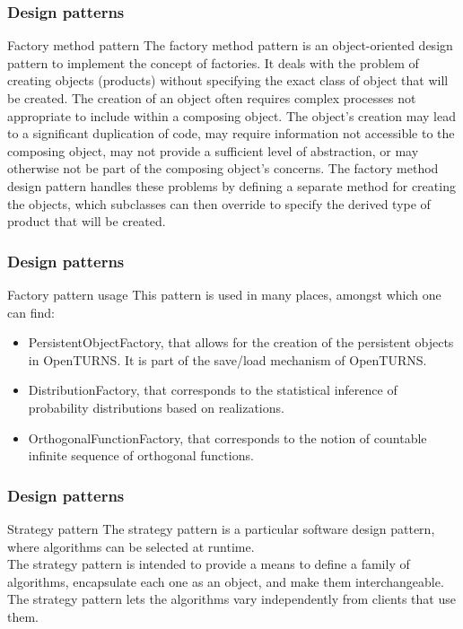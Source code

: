 \documentclass[8pt]{beamer}
\begin{document}
\begin{frame}
  \frametitle{Design patterns}
  \begin{block}{Factory method pattern}
    The \alert{factory method pattern} is an object-oriented design pattern to implement the concept of factories. It deals with the problem of creating objects (products) without specifying the exact class of object that will be created. The creation of an object often requires complex processes not appropriate to include within a composing object. The object's creation may lead to a significant duplication of code, may require information not accessible to the composing object, may not provide a sufficient level of abstraction, or may otherwise not be part of the composing object's concerns. The factory method design pattern handles these problems by defining a separate method for creating the objects, which subclasses can then override to specify the derived type of product that will be created.
  \end{block}
  \vspace{1mm}
  \centering {}
\end{frame}

\begin{frame}
  \frametitle{Design patterns}
  \begin{block}{Factory pattern usage}
    This pattern is used in many places, amongst which one can find:
    \begin{itemize}
    \item \alert{PersistentObjectFactory}, that allows for the creation of the persistent objects in OpenTURNS. It is part of the save/load mechanism of OpenTURNS.
    \item \alert{DistributionFactory}, that corresponds to the statistical inference of probability distributions based on realizations.
    \item \alert{OrthogonalFunctionFactory}, that corresponds to the notion of countable infinite sequence of orthogonal functions.
    \end{itemize}
  \end{block}
\end{frame}

\begin{frame}
  \frametitle{Design patterns}
  \begin{block}{Strategy pattern}
    The \alert{strategy pattern} is a particular software design pattern, where algorithms can be selected at runtime.\\
    The strategy pattern is intended to provide a means to define a family of algorithms, encapsulate each one as an object, and make them interchangeable. The strategy pattern lets the algorithms vary independently from clients that use them.
  \end{block}
  \centering {}
\end{frame}
\end{document}
